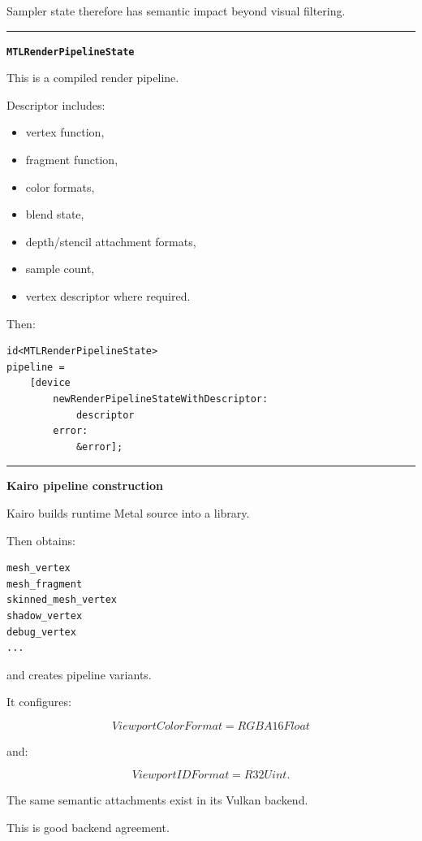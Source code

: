 Sampler state therefore has semantic impact beyond visual filtering.

\begin{center}\rule{0.5\linewidth}{0.5pt}\end{center}

\textbf{\texttt{MTLRenderPipelineState}}

This is a compiled render pipeline.

Descriptor includes:

\begin{itemize}
\tightlist
\item
  vertex function,
\item
  fragment function,
\item
  color formats,
\item
  blend state,
\item
  depth/stencil attachment formats,
\item
  sample count,
\item
  vertex descriptor where required.
\end{itemize}

Then:

\begin{verbatim}
id<MTLRenderPipelineState>
pipeline =
    [device
        newRenderPipelineStateWithDescriptor:
            descriptor
        error:
            &error];
\end{verbatim}

\begin{center}\rule{0.5\linewidth}{0.5pt}\end{center}

\textbf{Kairo pipeline construction}

Kairo builds runtime Metal source into a library.

Then obtains:

\begin{verbatim}
mesh_vertex
mesh_fragment
skinned_mesh_vertex
shadow_vertex
debug_vertex
...
\end{verbatim}

and creates pipeline variants.

It configures:

\[
ViewportColorFormat=RGBA16Float
\]

and:

\[
ViewportIDFormat=R32Uint.
\]

The same semantic attachments exist in its Vulkan backend.

This is good backend agreement.

